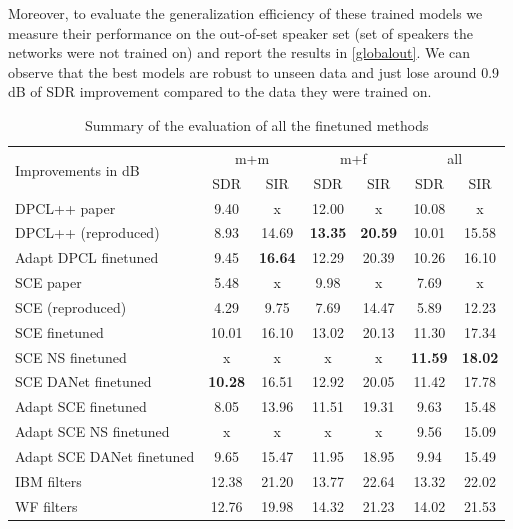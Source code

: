 \documentclass[master, tikz, final,11pt, dvipdfmx]{iscs-thesis}
\begin{document}
Moreover, to evaluate the generalization efficiency of these trained models we measure their performance on the out-of-set speaker set (set of speakers the networks were not trained on) and report the results in \autoref{globalout}. We can observe that the best models are robust to unseen data and just lose around 0.9 dB of SDR improvement compared to the data they were trained on.

\begin{table}[h]
\centering
\begin{tabular}{l|c|c|c|c|c|c}
\multirow{2}{*}{Improvements in dB} & \multicolumn{2}{c|}{m+m} & \multicolumn{2}{c|}{m+f} & \multicolumn{2}{c}{all} \\ 
\cline{2-7} 
 & SDR & SIR & SDR & SIR & SDR & SIR \\ 
\hline 
DPCL++ paper \cite{DPCLV2} & 9.40 & x & 12.00 & x & 10.08 & x \\ 
DPCL++ (reproduced) & 8.93 & 14.69 & \cellcolor{green}\textbf{13.35} & \cellcolor{green}\textbf{20.59} & 10.01 & 15.58 \\ 
Adapt DPCL finetuned & 9.45 & \textbf{16.64} & 12.29 & 20.39 & 10.26 & 16.10 \\ 
\hline
\hline
SCE paper \cite{SCE} & 5.48 & x & 9.98 & x & 7.69 & x \\ 
SCE (reproduced) & 4.29 & 9.75 & 7.69 & 14.47 & 5.89 & 12.23 \\ 
SCE finetuned & 10.01 & 16.10 & 13.02 & 20.13 & 11.30 & 17.34 \\ 
SCE NS finetuned & x & x & x & x & \cellcolor{green}\textbf{11.59} & \cellcolor{green}\textbf{18.02} \\ 
SCE DANet finetuned & \cellcolor{green}\textbf{10.28} & \cellcolor{green}16.51 & 12.92 & 20.05 & 11.42 & 17.78 \\ 
Adapt SCE finetuned  & 8.05 & 13.96 & 11.51 & 19.31 & 9.63 & 15.48 \\ 
Adapt SCE NS finetuned& x & x & x & x & 9.56 & 15.09 \\ 
Adapt SCE DANet finetuned & 9.65 & 15.47 & 11.95 & 18.95 & 9.94 & 15.49 \\
\hline
\hline
IBM filters & 12.38 & 21.20 & 13.77 & 22.64 & 13.32 & 22.02 \\ 
WF filters & 12.76 & 19.98 & 14.32 & 21.23 & 14.02 & 21.53 \\ 

\end{tabular}
\caption{Summary of the evaluation of all the finetuned methods}
\label{global}
\end{table}
\end{document}
